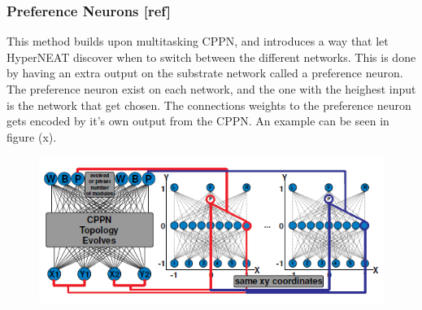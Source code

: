 \subsubsection{Preference Neurons [ref]}
This method builds upon multitasking CPPN, and introduces a way that let HyperNEAT discover when to switch between the different networks. This is done by having an extra output on the substrate network called a preference neuron. The preference neuron exist on each network, and the one with the heighest input is the network that get chosen. The connections weights to the preference neuron gets encoded by it's own output from the CPPN. An example can be seen in figure (x).
\begin{figure}[!ht]
\centering
\includegraphics[scale=0.6]{PreferenceNeurons}
\caption{}
\end{figure}
%